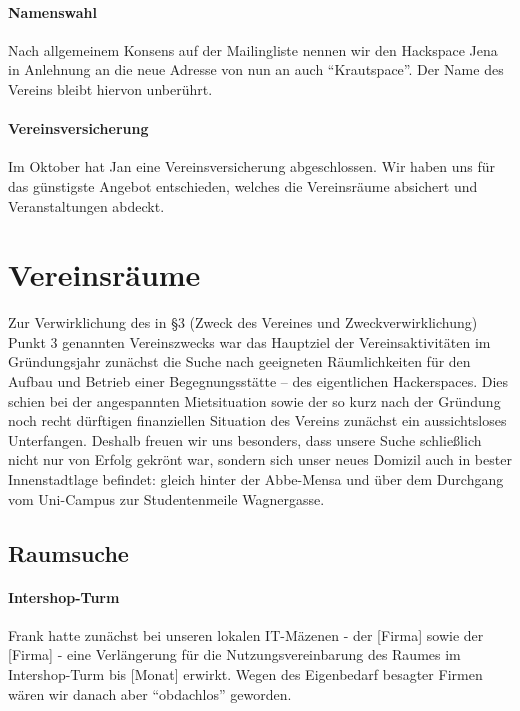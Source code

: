 \documentclass[10pt,DIV16]{scrartcl}
\begin{document}
\paragraph{Namenswahl}

Nach allgemeinem Konsens auf der Mailingliste nennen wir den Hackspace Jena in
Anlehnung an die neue Adresse von nun an auch "`Krautspace"'.  Der Name des
Vereins bleibt hiervon unberührt.

\paragraph{Vereinsversicherung}

Im Oktober hat Jan eine Vereinsversicherung abgeschlossen.  Wir haben uns für
das günstigste Angebot entschieden, welches die Vereinsräume absichert und
Veranstaltungen abdeckt.


\section{Vereinsräume}

Zur Verwirklichung des in §3 (Zweck des Vereines und Zweckverwirklichung)
Punkt 3 genannten Vereinszwecks war das Hauptziel der Vereinsaktivitäten im
Gründungsjahr zunächst die Suche nach geeigneten Räumlichkeiten für den Aufbau
und Betrieb einer Begegnungsstätte -- des eigentlichen Hackerspaces.  Dies
schien bei der angespannten Mietsituation sowie der so kurz nach der Gründung
noch recht dürftigen finanziellen Situation des Vereins zunächst ein
aussichtsloses Unterfangen.  Deshalb freuen wir uns besonders, dass unsere
Suche schließlich nicht nur von Erfolg gekrönt war, sondern sich unser neues
Domizil auch in bester Innenstadtlage befindet:  gleich hinter der Abbe-Mensa
und über dem Durchgang vom Uni-Campus zur Studentenmeile Wagnergasse.

\subsection{Raumsuche}

\paragraph{Intershop-Turm}

Frank hatte zunächst bei unseren lokalen IT-Mäzenen - der [Firma] sowie der
[Firma] - eine Verlängerung für die Nutzungsvereinbarung des Raumes im
Intershop-Turm bis [Monat] erwirkt.  Wegen des Eigenbedarf besagter Firmen
wären wir danach aber "`obdachlos"' geworden.
\end{document}
